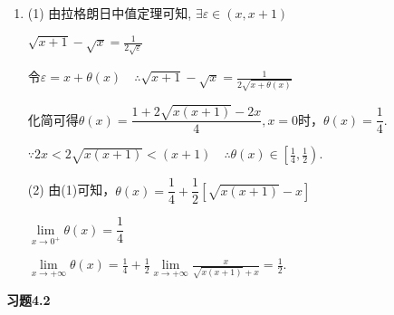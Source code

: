 \documentclass{article}
\begin{document}
\begin{enumerate}[1.]
				$\because f(x_0+\varDelta)-f(x_0)=f'(x_0+\theta\varDelta x)\varDelta x \qquad \therefore \varepsilon=x_0+\theta\varDelta x$.
				
				$\theta=\frac{\varepsilon-x_0}{\varDelta x}. \therefore\lim\limits_{\varDelta\to 0}\theta=\lim\limits_{\varDelta\to 0}\frac{\varepsilon-x_0}{\varDelta x}$
				
				$\because f(x)=\frac{1}{x} \quad \therefore f(x_0+\varDelta x)-f(x_0)=\frac{1}{x_0+\varDelta}-\frac{1}{x_0}=\frac{-\varDelta x}{x_0(x_0+\varDelta x}=f'(\varepsilon)\varDelta x$
				
				$\therefore f'(\varepsilon=-\frac{1}{x_0(x_0+\varDelta x)}. \quad f'(\varepsilon)=-\frac{1}{\varepsilon^2}\qquad -\frac{1}{\varepsilon^2}=-\frac{1}{x_0(x_0+\varDelta x)}$
				
				$\varepsilon=\sqrt{x_0(x_0+\varDelta x)}$ 代入$\lim\limits_{\varDelta\to 0}\frac{\varepsilon-x_0}{\varDelta x}=\frac{\sqrt{x_0(x_0+\varDelta x)}-x_0}{\varDelta x}\xlongequal[\text{洛必达}]{}\dfrac{x_0}{2\sqrt{x_0(x_0+\varDelta x)}}=\dfrac{1}{2}$.
			
			\item (1) 由拉格朗日中值定理可知, $\exists \varepsilon\in(x, x+1)$
			
				$\sqrt{x+1}-\sqrt{x}=\frac{1}{2 \sqrt{\varepsilon}}$
				
				令$\varepsilon=x+\theta(x) \quad \therefore \sqrt{x+1}-\sqrt{x}=\frac{1}{2 \sqrt{x+\theta(x)}}$
				
				化简可得$\theta(x)=\dfrac{1+2\sqrt{x(x+1)}-2x}{4}, x=0$时，$\theta(x)=\dfrac{1}{4}$.
				
				$\because 2 x<2 \sqrt{x(x+1)}<(x+1) \quad \therefore \theta(x) \in\left[\frac{1}{4}, \frac{1}{2}\right).$
				
				(2) 由(1)可知，$\theta(x)=\dfrac{1}{4}+\dfrac{1}{2}[\sqrt{x(x+1)}-x]$
				
				$\lim\limits_{x\to 0^+}\theta(x)=\dfrac{1}{4}$
				
				$\lim\limits_{x\to +\infty}\theta(x)=\frac{1}{4}+\frac{1}{2} \lim\limits _{x \rightarrow+\infty} \frac{x}{\sqrt{x(x+1)}+x}=\frac{1}{2}.$
		\end{enumerate}	
	
	\newpage
	\begin{center}
		{\bf 习题4.2}
	\end{center}
	
\end{document}
